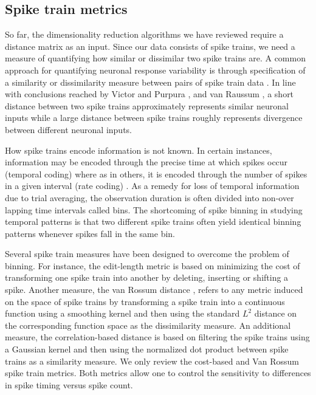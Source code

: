
\subsection{Spike train metrics}
So far, the dimensionality reduction algorithms we have reviewed require a distance matrix
as an input. Since our data consists of spike trains, we need a measure of quantifying how 
similar or dissimilar two spike trains are.
A common approach for quantifying neuronal response variability is through specification of a  similarity or dissimilarity measure between pairs of spike train data \cite{Brown2004, Victor1996, Victor1998,Rossum2001,houghton2010measuring}. In line with conclusions reached by Victor and Purpura \cite{Victor1996, Victor1998}, and van Raussum \cite{Rossum2001}, a short distance between two spike trains approximately represents similar neuronal inputs while a large distance between spike trains roughly represents divergence between different neuronal inputs.


How spike trains encode information is not known. In certain instances, information may be encoded through the precise time at which spikes occur (temporal coding) where as in others, it is encoded through the number of spikes in a given interval (rate coding) \cite{Abbott2001}.
As a remedy for loss of temporal information due to trial averaging, the observation duration is often divided into non-over lapping time intervals called bins. The shortcoming of spike binning in studying temporal patterns is that two different spike trains often yield identical binning patterns whenever spikes fall in the same bin.


Several spike train measures have been designed to overcome the problem of binning. For instance, the edit-length metric \cite{Victor1996, Victor1998} is based on minimizing the cost of transforming one spike train into another by deleting, inserting or shifting a spike. Another measure, the van Rossum distance \cite{Rossum2001,houghton2010measuring}, refers to any metric induced on the space of spike trains by transforming a spike train into a continuous function using a smoothing kernel and then using the standard $L^2$ distance on the corresponding function space as the dissimilarity measure. An additional measure, the correlation-based distance \cite{Schreiber2003} is based on filtering the spike trains using a Gaussian kernel and then using the normalized dot product between  spike trains as a  similarity measure.
We only review the cost-based and Van Rossum spike train metrics. Both metrics allow one to control the sensitivity to differences in spike timing versus spike count.

